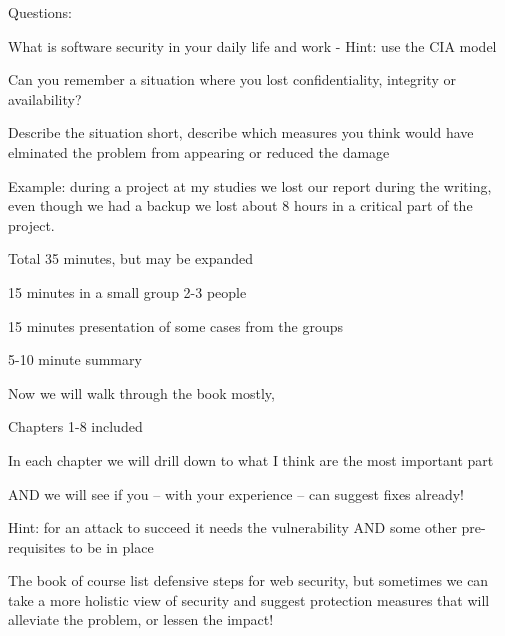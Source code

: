 \documentclass[Screen16to9,17pt]{foils}
\begin{document}
Questions:
\begin{list2}
\item What is software security in your daily life and work - Hint: use the CIA model

\item Can you remember a situation where you lost confidentiality, integrity or availability?

\item Describe the situation short, describe which measures you think would have elminated the problem from appearing or reduced the damage

\item Example: during a project at my studies we lost our report during the writing, even though we had a backup we lost about 8 hours in a critical part of
the project.
\end{list2}



Total 35 minutes, but may be expanded

\begin{list2}
\item 15 minutes in a small group 2-3 people
\item 15 minutes presentation of some cases from the groups
\item 5-10 minute summary
\end{list2}




Now we will walk through the book mostly,
\begin{list2}
\item Chapters 1-8 included
\item In each chapter we will drill down to what I think are the most important part
\item AND we will see if you -- with your experience -- can suggest fixes already!
\item Hint: for an attack to succeed it needs the vulnerability AND some other pre-requisites to be in place
\end{list2}

The book of course list defensive steps for web security, but sometimes we can
take a more holistic view of security and suggest protection measures that will
alleviate the problem, or lessen the impact!

\end{document}
